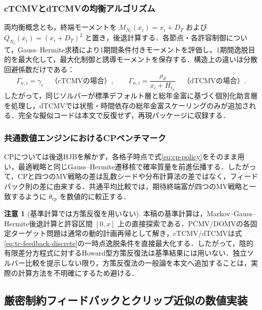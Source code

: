 \documentclass[10pt,a4paper]{article}
\theoremstyle{plain}
\theoremstyle{definition}
\newtheorem{remark}{注意}
\begin{document}
\subsubsection{cTCMVとdTCMVの均衡アルゴリズム}
両均衡概念とも，終端モーメントを $M_{N_t}(x_i)=x_i+D_T$ および $Q_{N_t}(x_i)=(x_i+D_T)^2$ と置き，後退計算する．各節点・各許容制御について，Gauss--Hermite求積により1期間条件付きモーメントを評価し，1期間逸脱目的を最大化して，最大化制御と誘導モーメントを保存する．構造上の違いは分散回避係数だけである：
\begin{equation}
\Gamma_{n,i}=\gamma_c\quad\text{（cTCMVの場合）},
\qquad
\Gamma_{n,i}=\frac{\rho_d}{x_i+H_{t_n}}\quad\text{（dTCMVの場合）}.
\label{eq:gamma-grid-compact}
\end{equation}
したがって，同じソルバーが標準デフォルト層と総年金富に基づく個別化助言層を処理し，dTCMVでは状態・時間依存の総年金富スケーリングのみが追加される．完全な擬似コードは本文で反復せず，再現パッケージに収録する．




\subsubsection{共通数値エンジンにおけるCPベンチマーク}

CPについては後退HJBを解かず，各格子時点で式\eqref{eq:cp-policy}をそのまま用い，最適戦略と同じGauss--Hermite遷移核で確率質量を前進伝播する．したがって，CPと四つのMV戦略の差は乱数シードや分布計算法の差ではなく，フィードバック則の差に由来する．共通平均比較では，期待終端富が四つのMV戦略と一致するように $\theta_{cp}$ を数値的に較正する．

\begin{remark}[基準計算では方策反復を用いない]
本稿の基準計算は，Markov--Gauss--Hermite後退計算と許容区間 $[0,x]$ 上の直接探索である．PCMV/DOMVの各固定ターゲット問題は通常の動的計画再帰として解き，cTCMV/dTCMVは式\eqref{eq:tc-feedback-discrete}の一時点逸脱条件を直接最大化する．したがって，陰的有限差分方程式に対するHoward型方策反復法は基準結果には用いない．独立ソルバー比較を提示しない限り，方策反復法の一般論を本文へ追加することは，実際の計算方法を不明確にするため避ける．
\end{remark}

\subsection{厳密制約フィードバックとクリップ近似の数値実装}
\label{sec:projection-gap}
\end{document}
